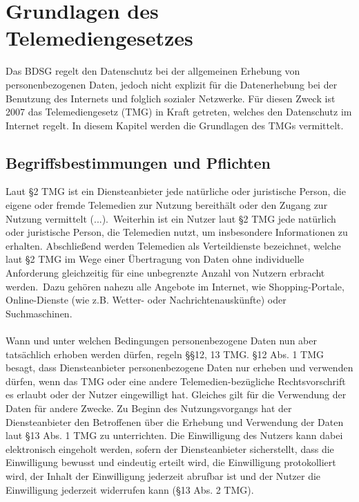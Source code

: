 \chapter{Grundlagen des Telemediengesetzes}
Das BDSG regelt den Datenschutz bei der allgemeinen Erhebung von personenbezogenen Daten, jedoch nicht explizit für die Datenerhebung bei der Benutzung des Internets und folglich sozialer Netzwerke. Für diesen Zweck ist 2007 das Telemediengesetz (\acs{TMG}) in Kraft getreten, welches den Datenschutz im Internet regelt.\autocite[vgl.][]{klicksafe.de} \autocite[vgl.][]{shr.de} In diesem Kapitel werden die Grundlagen des TMGs vermittelt.
\section{Begriffsbestimmungen und Pflichten}
Laut \S 2 TMG ist ein Diensteanbieter \glqq jede natürliche oder juristische Person, die eigene oder fremde Telemedien zur Nutzung bereithält oder den Zugang zur Nutzung vermittelt (...).\grqq \ Weiterhin ist ein Nutzer laut \S 2 TMG jede natürlich oder juristische Person, die Telemedien nutzt, um insbesondere Informationen zu erhalten. Abschließend werden Telemedien als Verteildienste bezeichnet, welche laut \S 2 TMG \glqq im Wege einer Übertragung von Daten ohne individuelle Anforderung gleichzeitig für eine unbegrenzte Anzahl von Nutzern erbracht werden.\grqq \ Dazu gehören nahezu alle Angebote im Internet, wie Shopping-Portale, Online-Dienste (wie z.B. Wetter- oder Nachrichtenauskünfte) oder Suchmaschinen.\autocite[vgl.][]{shr.de}\\
\\Wann und unter welchen Bedingungen personenbezogene Daten nun aber tatsächlich erhoben werden dürfen, regeln \S\S 12, 13 TMG.  \S 12 Abs. 1 TMG besagt, dass Diensteanbieter personenbezogene Daten nur erheben und verwenden dürfen, wenn das TMG oder eine andere Telemedien-bezügliche Rechtsvorschrift es erlaubt oder der Nutzer eingewilligt hat. Gleiches gilt für die Verwendung der Daten für andere Zwecke. Zu Beginn des Nutzungsvorgangs hat der Diensteanbieter den Betroffenen über die Erhebung und Verwendung der Daten laut \S 13 Abs. 1 TMG zu unterrichten. Die Einwilligung des Nutzers kann dabei elektronisch eingeholt werden, sofern der Diensteanbieter sicherstellt, dass die Einwilligung bewusst und eindeutig erteilt wird, die Einwilligung protokolliert wird, der Inhalt der Einwilligung jederzeit abrufbar ist und der Nutzer die Einwilligung jederzeit widerrufen kann (\S 13 Abs. 2 TMG).
